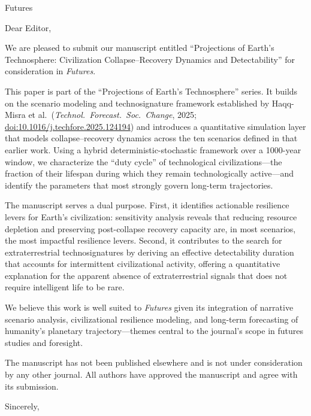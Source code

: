 \documentclass[11pt]{letter}
\begin{document}
\begin{letter}{Futures}

\opening{Dear Editor,}

We are pleased to submit our manuscript entitled ``Projections of Earth's Technosphere: Civilization Collapse--Recovery Dynamics and Detectability'' for consideration in \textit{Futures}.

This paper is part of the ``Projections of Earth's Technosphere'' series. It builds on the scenario modeling and technosignature framework established by Haqq-Misra et al.\ (\textit{Technol.\ Forecast.\ Soc.\ Change}, 2025; \href{https://doi.org/10.1016/j.techfore.2025.124194}{doi:10.1016/j.techfore.2025.124194}) and introduces a quantitative simulation layer that models collapse--recovery dynamics across the ten scenarios defined in that earlier work. Using a hybrid deterministic-stochastic framework over a 1000-year window, we characterize the ``duty cycle'' of technological civilizations---the fraction of their lifespan during which they remain technologically active---and identify the parameters that most strongly govern long-term trajectories.

The manuscript serves a dual purpose. First, it identifies actionable resilience levers for Earth's civilization: sensitivity analysis reveals that reducing resource depletion and preserving post-collapse recovery capacity are, in most scenarios, the most impactful resilience levers. Second, it contributes to the search for extraterrestrial technosignatures by deriving an effective detectability duration that accounts for intermittent civilizational activity, offering a quantitative explanation for the apparent absence of extraterrestrial signals that does not require intelligent life to be rare.

We believe this work is well suited to \textit{Futures} given its integration of narrative scenario analysis, civilizational resilience modeling, and long-term forecasting of humanity's planetary trajectory---themes central to the journal's scope in futures studies and foresight.

The manuscript has not been published elsewhere and is not under consideration by any other journal. All authors have approved the manuscript and agree with its submission.

\closing{Sincerely,}

\end{letter}
\end{document}
